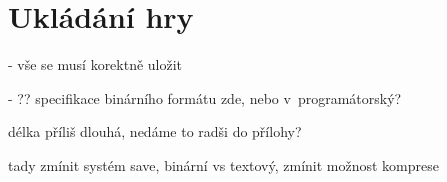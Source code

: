 
\section{Ukládání hry}

- vše se musí korektně uložit

- ?? specifikace binárního formátu zde, nebo v~programátorský?

délka příliš dlouhá, nedáme to radši do přílohy?

tady zmínit systém save, binární vs textový, zmínit možnost komprese